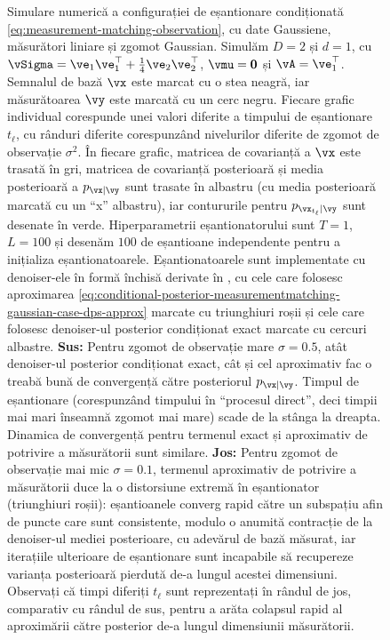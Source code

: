\documentclass[../../book-main_ro.tex]{subfiles}
\begin{document}
\begin{example}
\begin{figure}[tbp]
    \caption{Simulare numerică a configurației de eșantionare condiționată
    \eqref{eq:measurement-matching-observation}, cu date Gaussiene, măsurători
    liniare și zgomot Gaussian. Simulăm $D=2$ și $d=1$, cu $\vSigma
    = \ve_1 \ve_1^\top + \tfrac{1}{4} \ve_2 \ve_2^\top$, $\vmu = \Zero$ și
    $\vA = \ve_1^\top$. Semnalul de bază $\vx$ este marcat cu o stea neagră,
    iar măsurătoarea $\vy$ este marcată cu un cerc negru.
    Fiecare grafic individual corespunde unei valori diferite a timpului de eșantionare
    $t_{\ell}$, cu rânduri diferite corespunzând nivelurilor diferite de zgomot de observație
    $\sigma^2$.
    În fiecare grafic, matricea de covarianță a $\vx$ este trasată în gri, matricea
    de covarianță posterioară și media posterioară a $p_{\vx \mid \vy}$ sunt
    trasate în albastru (cu media posterioară marcată cu un ``x'' albastru), iar
    contururile pentru $p_{\vx_{t_{\ell}} \mid \vy}$ sunt desenate în verde. Hiperparametrii
    eșantionatorului sunt $T=1$, $L=100$ și desenăm $100$
    de eșantioane independente pentru a inițializa eșantionatoarele. Eșantionatoarele sunt implementate
    cu denoiser-ele în formă închisă derivate în
    , cu cele care folosesc
    aproximarea
    \eqref{eq:conditional-posterior-measurementmatching-gaussian-case-dps-approx}
    marcate cu triunghiuri roșii și cele care folosesc denoiser-ul posterior condiționat
    exact marcate cu cercuri albastre.
    \textbf{Sus:} Pentru zgomot de observație mare $\sigma = 0.5$, atât
    denoiser-ul posterior condiționat exact, cât și cel aproximativ fac o treabă bună de
    convergență către posteriorul $p_{\vx \mid \vy}$. Timpul de eșantionare (corespunzând
    timpului în ``procesul direct'', deci timpii mai mari înseamnă zgomot mai mare)
    scade de la stânga la dreapta. Dinamica de convergență pentru termenul exact și
    aproximativ de potrivire a măsurătorii sunt similare. \textbf{Jos:} Pentru
    zgomot de observație mai mic $\sigma = 0.1$,
    termenul aproximativ de potrivire a măsurătorii duce la o distorsiune extremă în eșantionator
    (triunghiuri roșii): eșantioanele converg rapid către un subspațiu afin
    de puncte care sunt consistente, modulo o anumită contracție de la denoiser-ul mediei posterioare,
    cu adevărul de bază măsurat, iar iterațiile ulterioare de eșantionare sunt
    incapabile să recupereze varianța posterioară pierdută de-a lungul acestei dimensiuni. Observați
    că timpi diferiți $t_{\ell}$ sunt reprezentați în rândul de jos, comparativ cu
    rândul de sus, pentru a arăta colapsul rapid al aproximării către
    posterior de-a lungul dimensiunii măsurătorii.}
    \label{fig:conditional_sampling_computational_gaussian}
  \end{figure}


\end{example}
\end{document}
